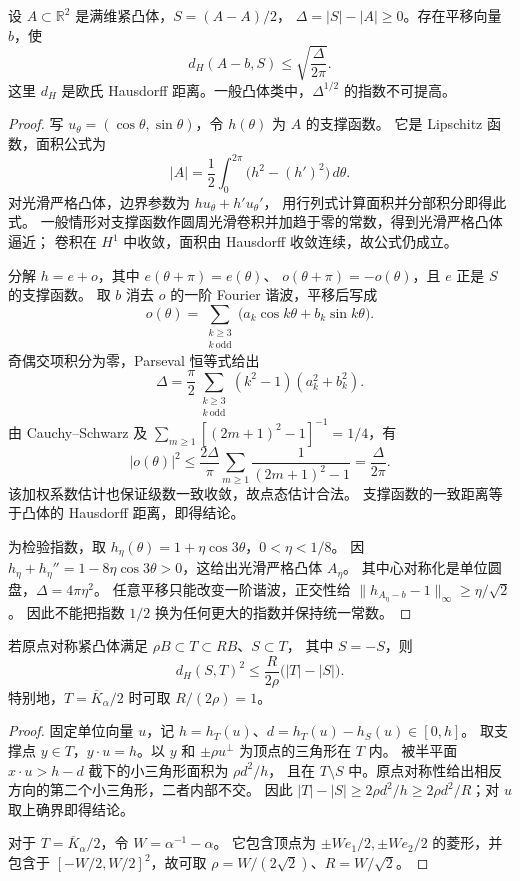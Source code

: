 \begin{lemma}[中心对称化的平方根稳定性]\label{pb:fourier-stability}
设 $A\subset\mathbb R^2$ 是满维紧凸体，$S=(A-A)/2$，
$\Delta=|S|-|A|\ge0$。存在平移向量 $b$，使
\[
 d_H(A-b,S)\le\sqrt{\frac{\Delta}{2\pi}}.
\]
这里 $d_H$ 是欧氏 Hausdorff 距离。一般凸体类中，$\Delta^{1/2}$ 的指数不可提高。
\end{lemma}
\begin{proof}
写 $u_\theta=(\cos\theta,\sin\theta)$，令 $h(\theta)$ 为 $A$ 的支撑函数。
它是 Lipschitz 函数，面积公式为
\begin{equation}\label{pb:support-area}
 |A|=\frac12\int_0^{2\pi}\bigl(h^2-(h')^2\bigr)\,d\theta.
\end{equation}
对光滑严格凸体，边界参数为 $h u_\theta+h'u_\theta'$，
用行列式计算面积并分部积分即得此式。
一般情形对支撑函数作圆周光滑卷积并加趋于零的常数，得到光滑严格凸体逼近；
卷积在 $H^1$ 中收敛，面积由 Hausdorff 收敛连续，故公式仍成立。

分解 $h=e+o$，其中 $e(\theta+\pi)=e(\theta)$、
$o(\theta+\pi)=-o(\theta)$，且 $e$ 正是 $S$ 的支撑函数。
取 $b$ 消去 $o$ 的一阶 Fourier 谐波，平移后写成
\[
 o(\theta)=\sum_{\substack{k\ge3\\ k\ \mathrm{odd}}}
 \bigl(a_k\cos k\theta+b_k\sin k\theta\bigr).
\]
奇偶交项积分为零，Parseval 恒等式给出
\[
 \Delta=\frac\pi2\sum_{\substack{k\ge3\\ k\ \mathrm{odd}}}
 (k^2-1)(a_k^2+b_k^2).
\]
由 Cauchy--Schwarz 及
$\sum_{m\ge1}[(2m+1)^2-1]^{-1}=1/4$，有
\[
 |o(\theta)|^2\le\frac{2\Delta}{\pi}
 \sum_{m\ge1}\frac1{(2m+1)^2-1}=\frac{\Delta}{2\pi}.
\]
该加权系数估计也保证级数一致收敛，故点态估计合法。
支撑函数的一致距离等于凸体的 Hausdorff 距离，即得结论。

为检验指数，取 $h_\eta(\theta)=1+\eta\cos3\theta$，$0<\eta<1/8$。
因 $h_\eta+h_\eta''=1-8\eta\cos3\theta>0$，这给出光滑严格凸体 $A_\eta$。
其中心对称化是单位圆盘，$\Delta=4\pi\eta^2$。
任意平移只能改变一阶谐波，正交性给
$\|h_{A_\eta-b}-1\|_\infty\ge\eta/\sqrt2$。
因此不能把指数 $1/2$ 换为任何更大的指数并保持统一常数。
\end{proof}

\begin{lemma}[对称嵌套凸体的缺面积与距离]\label{pb:cap-distance}
若原点对称紧凸体满足 $\rho B\subset T\subset RB$、$S\subset T$，
其中 $S=-S$，则
\[
 d_H(S,T)^2\le\frac R{2\rho}\bigl(|T|-|S|\bigr).
\]
特别地，$T=\overline K_\alpha/2$ 时可取 $R/(2\rho)=1$。
\end{lemma}
\begin{proof}
固定单位向量 $u$，记 $h=h_T(u)$、$d=h_T(u)-h_S(u)\in[0,h]$。
取支撑点 $y\in T$，$y\cdot u=h$。以 $y$ 和
$\pm\rho u^\perp$ 为顶点的三角形在 $T$ 内。
被半平面 $x\cdot u>h-d$ 截下的小三角形面积为 $\rho d^2/h$，
且在 $T\setminus S$ 中。原点对称性给出相反方向的第二个小三角形，二者内部不交。
因此 $|T|-|S|\ge2\rho d^2/h\ge2\rho d^2/R$；对 $u$ 取上确界即得结论。

对于 $T=\overline K_\alpha/2$，令 $W=\alpha^{-1}-\alpha$。
它包含顶点为 $\pm We_1/2,\pm We_2/2$ 的菱形，并包含于
$[-W/2,W/2]^2$，故可取 $\rho=W/(2\sqrt2)$、$R=W/\sqrt2$。
\end{proof}

